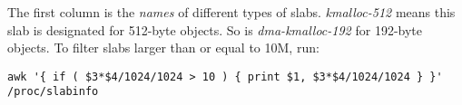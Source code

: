 \begin{landscape}
  The first column is the \textit{names} of different types of
  slabs. \textit{kmalloc-512} means this slab is designated for
  512-byte objects. So is \textit{dma-kmalloc-192} for 192-byte
  objects. To filter slabs larger than or equal to 10M, run:

\begin{lstlisting}
awk '{ if ( $3*$4/1024/1024 > 10 ) { print $1, $3*$4/1024/1024 } }' /proc/slabinfo
\end{lstlisting}

\end{landscape}

